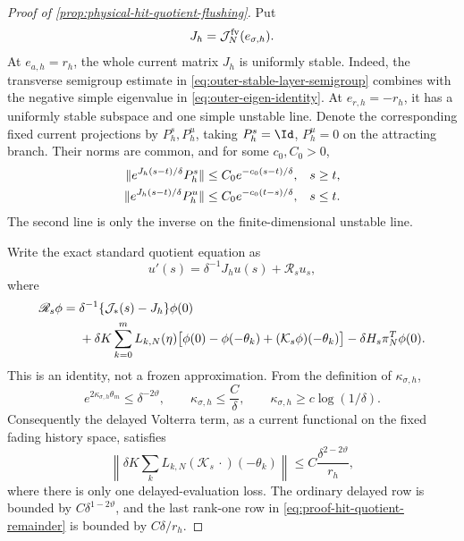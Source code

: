 \begin{proof}[Proof of
\cref{prop:physical-hit-quotient-flushing}]
Put
\[
 J_h=\mathcal J_N^{\rm fv}(e_{\sigma,h}).
\]
At \(e_{a,h}=r_h\), the whole current matrix \(J_h\) is uniformly
stable.  Indeed, the transverse semigroup estimate in
\cref{eq:outer-stable-layer-semigroup} combines with the negative simple
eigenvalue in \cref{eq:outer-eigen-identity}.  At
\(e_{r,h}=-r_h\), it has a uniformly stable subspace and one simple
unstable line.  Denote the corresponding fixed current projections by
\(P_h^s,P_h^u\), taking \(P_h^s=\Id\), \(P_h^u=0\) on the attracting
branch.  Their norms are common, and for some \(c_0,C_0>0\),
\begin{align}
 \|e^{J_h(s-t)/\delta}P_h^s\|
 &\le C_0e^{-c_0(s-t)/\delta},&&s\ge t,\notag\\
 \|e^{J_h(s-t)/\delta}P_h^u\|
 &\le C_0e^{-c_0(t-s)/\delta},&&s\le t.           \label{eq:proof-hit-current-green-bounds}
\end{align}
The second line is only the inverse on the finite-dimensional unstable
line.

Write the exact standard quotient equation as
\begin{equation}
 u'(s)=\delta^{-1}J_hu(s)+\mathscr R_su_s,         \label{eq:proof-hit-quotient-perturbation}
\end{equation}
where
\begin{align}
 \mathscr R_s\phi
={}&\delta^{-1}\{\mathcal J_*(s)-J_h\}\phi(0)\notag\\
 &+\delta K\sum_{k=0}^mL_{k,N}(\eta)
   \bigl[\phi(0)-\phi(-\theta_k)
          +(\mathcal K_s\phi)(-\theta_k)\bigr]
   -\delta H_s\pi_N^T\phi(0).                    \label{eq:proof-hit-quotient-remainder}
\end{align}
This is an identity, not a frozen approximation.  From the definition of
\(\kappa_{\sigma,h}\),
\begin{equation}
 e^{2\kappa_{\sigma,h}\theta_m}
 \le\delta^{-2\vartheta},\qquad
 \kappa_{\sigma,h}\le\frac{C}{\delta},\qquad
 \kappa_{\sigma,h}\ge c\log(1/\delta).            \label{eq:proof-hit-rate-ledger}
\end{equation}
Consequently the delayed Volterra term, as a current functional on the
fixed fading history space, satisfies
\begin{equation}
 \left\|\delta K\sum_kL_{k,N}
       (\mathcal K_s\,\cdot)(-\theta_k)\right\|
 \le C\frac{\delta^{2-2\vartheta}}{r_h},          \label{eq:proof-hit-volterra-evaluation}
\end{equation}
where there is only one delayed-evaluation loss.  The ordinary delayed
row is bounded by \(C\delta^{1-2\vartheta}\), and the last rank-one row
in \cref{eq:proof-hit-quotient-remainder} is bounded by \(C\delta/r_h\).


\end{proof}
